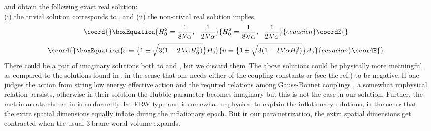 \documentclass[a4paper,12pt]{article}
\begin{document}
and obtain the following exact real solution:\\
(i) the trivial solution corresponds to \coordHE{}, and 
(ii) the non-trivial real solution implies 
\begin{equation}\coord{}\boxEquation{
H_0^2=\frac{1}{8\lambda'\alpha}, ~~ \frac{1}{2\lambda'\alpha}
}{
H_0^2=\frac{1}{8\lambda'\alpha}, ~~ \frac{1}{2\lambda'\alpha}
}{ecuacion}\coordE{}\end{equation}
\begin{equation}\coord{}\boxEquation{
\upsilon=\big\{1\pm\sqrt{3(1-2\lambda'\alpha H_0^2)}\big\}H_0
}{
\upsilon=\big\{1\pm\sqrt{3(1-2\lambda'\alpha H_0^2)}\big\}H_0
}{ecuacion}\coordE{}\end{equation}
There could be a pair of imaginary solutions both to \coordHE{} and \myHighlight{$\upsilon$}\coordHE{}, 
but we discard them. The above solutions could be physically more 
meaningful as compared to the solutions found in \cite{ILS}, in the sense 
that one needs either of the coupling constants \coordHE{} or \coordHE{} 
(see the ref.\cite{ILS}) to be negative. If one judges the action from 
string low energy effective action and the required relations among 
Gauss-Bonnet couplings \myHighlight{$\alpha, \beta, \gamma$}\coordHE{}, a somewhat unphysical 
relation persists, otherwise in their solution the Hubble 
parameter becomes imaginary but this is not the case in our solution. 
Further, the metric ansatz chosen in \cite{ILS} is conformally flat FRW 
type and is somewhat unphysical to explain the inflationary solutions, in the 
sense that the extra spatial dimensions equally inflate during the 
inflationary epoch. But in our parametrization, the extra spatial dimensions 
get contracted when the usual 3-brane world volume expands.   

\end{document}

